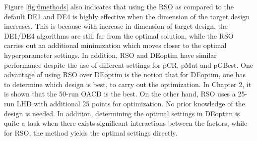 \documentclass [PhD] {package/uclathes}
\begin{document}
Figure \ref{fig:6methods} also indicates that using the RSO as compared to the default DE1 and DE4 is highly effective when the dimension of the target design increases. This is because with increase in dimension of target design, the DE1/DE4 algorithms are still far from the optimal solution, while the RSO carries out an additional minimization which moves closer to the optimal hyperparameter settings. In addition, RSO and DEoptim have similar performance despite the use of different settings for pCR, pMut and pGBest. One advantage of using RSO over DEoptim is the notion that for DEoptim, one has to determine which design is best, to carry out the optimization. In Chapter 2, it is shown that the 50-run OACD is the best. On the other hand, RSO uses a 25-run LHD with additional 25 points for optimization. No prior knowledge of the design is needed. In addition, determining the optimal settings in DEoptim is quite a task when there exists significant interactions between the factors, while for RSO, the method yields the optimal settings directly.


\end{document}
